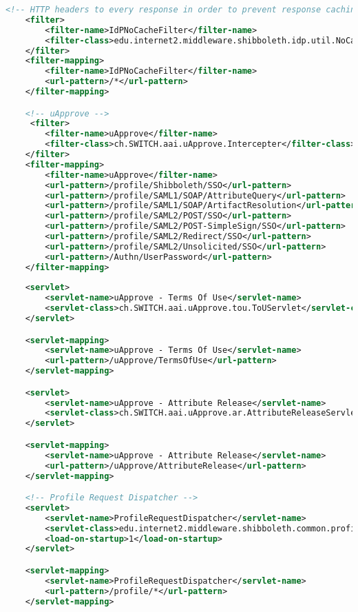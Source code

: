 \begin{lstlisting}[language=xml]
    <!-- HTTP headers to every response in order to prevent response caching -->
    <filter>
        <filter-name>IdPNoCacheFilter</filter-name>
        <filter-class>edu.internet2.middleware.shibboleth.idp.util.NoCacheFilter</filter-class>
    </filter>
    <filter-mapping>
        <filter-name>IdPNoCacheFilter</filter-name>
        <url-pattern>/*</url-pattern>
    </filter-mapping>

    <!-- uApprove -->
     <filter>
        <filter-name>uApprove</filter-name>
        <filter-class>ch.SWITCH.aai.uApprove.Intercepter</filter-class>
    </filter>
    <filter-mapping>
        <filter-name>uApprove</filter-name>
        <url-pattern>/profile/Shibboleth/SSO</url-pattern>
        <url-pattern>/profile/SAML1/SOAP/AttributeQuery</url-pattern>
        <url-pattern>/profile/SAML1/SOAP/ArtifactResolution</url-pattern>
        <url-pattern>/profile/SAML2/POST/SSO</url-pattern>
        <url-pattern>/profile/SAML2/POST-SimpleSign/SSO</url-pattern>
        <url-pattern>/profile/SAML2/Redirect/SSO</url-pattern>
        <url-pattern>/profile/SAML2/Unsolicited/SSO</url-pattern>
        <url-pattern>/Authn/UserPassword</url-pattern>
    </filter-mapping>
    
    <servlet>
        <servlet-name>uApprove - Terms Of Use</servlet-name>
        <servlet-class>ch.SWITCH.aai.uApprove.tou.ToUServlet</servlet-class>
    </servlet>

    <servlet-mapping>
        <servlet-name>uApprove - Terms Of Use</servlet-name>
        <url-pattern>/uApprove/TermsOfUse</url-pattern>
    </servlet-mapping>

    <servlet>
        <servlet-name>uApprove - Attribute Release</servlet-name>
        <servlet-class>ch.SWITCH.aai.uApprove.ar.AttributeReleaseServlet</servlet-class>
    </servlet>

    <servlet-mapping>
        <servlet-name>uApprove - Attribute Release</servlet-name>
        <url-pattern>/uApprove/AttributeRelease</url-pattern>
    </servlet-mapping>

    <!-- Profile Request Dispatcher -->
    <servlet>
        <servlet-name>ProfileRequestDispatcher</servlet-name>
        <servlet-class>edu.internet2.middleware.shibboleth.common.profile.ProfileRequestDispatcherServlet</servlet-class>
        <load-on-startup>1</load-on-startup>
    </servlet>

    <servlet-mapping>
        <servlet-name>ProfileRequestDispatcher</servlet-name>
        <url-pattern>/profile/*</url-pattern>
    </servlet-mapping>


\end{lstlisting}

